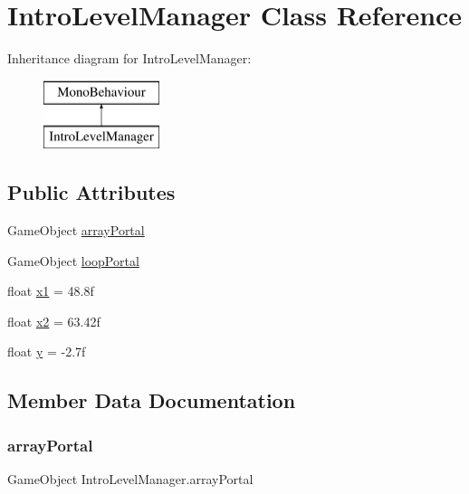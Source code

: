 \hypertarget{class_intro_level_manager}{}\section{Intro\+Level\+Manager Class Reference}
\label{class_intro_level_manager}
Inheritance diagram for Intro\+Level\+Manager\+:\begin{figure}[H]
\begin{center}
\leavevmode
\includegraphics[height=2.000000cm]{class_intro_level_manager}
\end{center}
\end{figure}
\subsection*{Public Attributes}
\begin{DoxyCompactItemize}
\item 
Game\+Object \hyperlink{class_intro_level_manager_ad6a0e7ffa4f50654f032516f26d50058}{array\+Portal}
\item 
Game\+Object \hyperlink{class_intro_level_manager_aa84bfec3c06a01b9417f2f7a4eff5e39}{loop\+Portal}
\item 
float \hyperlink{class_intro_level_manager_a01ffda007d472014f877a8d70c66d3af}{x1} = 48.\+8f
\item 
float \hyperlink{class_intro_level_manager_ad1c4e0b7a9ef9ea24d72a21f20b86fc3}{x2} = 63.\+42f
\item 
float \hyperlink{class_intro_level_manager_a0e0549499a223271048ede469a256236}{y} = -\/2.\+7f
\end{DoxyCompactItemize}


\subsection{Member Data Documentation}
\mbox{\label{class_intro_level_manager_ad6a0e7ffa4f50654f032516f26d50058}} 
\subsubsection{\texorpdfstring{array\+Portal}{arrayPortal}}
{\footnotesize\ttfamily Game\+Object Intro\+Level\+Manager.\+array\+Portal}

